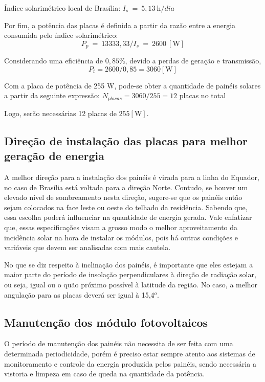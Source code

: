 	Índice solarimétrico local de Brasília: $I_s\ =\ 5,13\ \si{\hour}/dia$

	Por fim, a potência das placas é definida a partir da razão entre a energia consumida pelo índice solarimétrico:$$P_p\ =\ 13333,33/I_s\ =\ 2600\ [\si{\watt}]$$

	Considerando uma eficiência de $0,85\%$, devido a perdas de geração e transmissão, $$P_t = 2600/0,85 = 3060 [\si{\watt}]$$

	Com a placa de potência de 255 W, pode-se obter a quantidade de painéis solares a partir da seguinte expressão: $N_{placas} = 3060/255 = 12$ placas no total

	Logo, serão necessárias 12 placas de $255 [\si{\watt}]$.

\subsection{Direção de instalação das placas para melhor geração de energia}

	A melhor direção para a instalação dos painéis é virada para a linha do Equador, no caso de Brasília está voltada para a direção Norte. Contudo, se houver um elevado nível de sombreamento nesta direção, sugere-se que os painéis então sejam colocados na face leste ou oeste do telhado da residência. Sabendo que, essa escolha poderá influenciar na quantidade de energia gerada. Vale enfatizar que, essas especificações visam a grosso modo o melhor aproveitamento da incidência solar na hora de instalar os módulos, pois há outras condições e variáveis que devem ser analisadas com mais cautela.

	No que se diz respeito à inclinação dos painéis, é importante que eles estejam a maior parte do período de insolação perpendiculares à direção de radiação solar, ou seja, igual ou o quão próximo possível à latitude da região. No caso, a melhor angulação para as placas deverá ser igual à 15,4$^o$.

\subsection{Manutenção dos módulo fotovoltaicos}

	O período de manutenção dos painéis não necessita de ser feita com uma determinada periodicidade, porém é preciso estar sempre atento aos sistemas de monitoramento e controle da energia produzida pelos painéis, sendo necessária a vistoria e limpeza em caso de queda na quantidade da potência.

